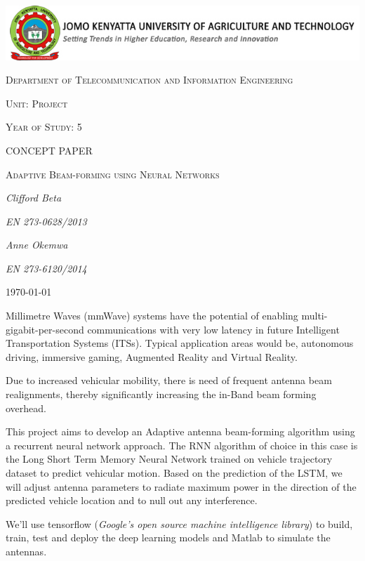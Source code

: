 \documentclass[12pt,a4paper]{article}
\begin{document}
\begin{titlepage}
	\centering
	\includegraphics[width=1.2\textwidth]{src/logo-jkuat.jpg}\par\vspace{1cm}
	\vspace{1cm}
	{\scshape\Large Department of Telecommunication and Information Engineering\par}
	\vspace{1cm}
	{\scshape\Large Unit: Project\par}
	\vspace{1cm}
	{\scshape\Large Year of Study: 5\par}
	\vspace{1cm}
	{\scshape\Large CONCEPT PAPER\par}
	\vspace{1cm}
	{\scshape\Large Adaptive Beam-forming using Neural Networks\par}
	\vspace{1cm}
	
	{\Large\itshape Clifford Beta \par}
	{\Large\itshape EN 273-0628/2013\par}
	{\Large\itshape Anne Okemwa \par}
	{\Large\itshape EN 273-6120/2014\par}
	\vfill




	{\large \today\par}

\end{titlepage}
\newpage
\par Millimetre Waves (mmWave) systems have the potential of enabling multi-gigabit-per-second communications with very low latency in future Intelligent Transportation Systems (ITSs). Typical application areas would be, autonomous driving, immersive gaming, Augmented Reality and Virtual Reality.

\par Due to increased vehicular mobility, there is need of frequent antenna beam realignments, thereby significantly increasing the in-Band beam forming overhead.

\par This project aims to develop an Adaptive antenna beam-forming algorithm using a recurrent neural network approach. The RNN algorithm of choice in this case is the Long Short Term Memory Neural Network trained on vehicle trajectory dataset to predict vehicular motion.
Based on the prediction of the LSTM, we will adjust antenna parameters to radiate maximum power in the direction of the predicted vehicle location and to null out any
interference.
\par We'll use tensorflow (\emph {Google's open source machine intelligence library}) to build, train, test and deploy the deep learning models and Matlab to simulate the antennas. 
\end{document}
